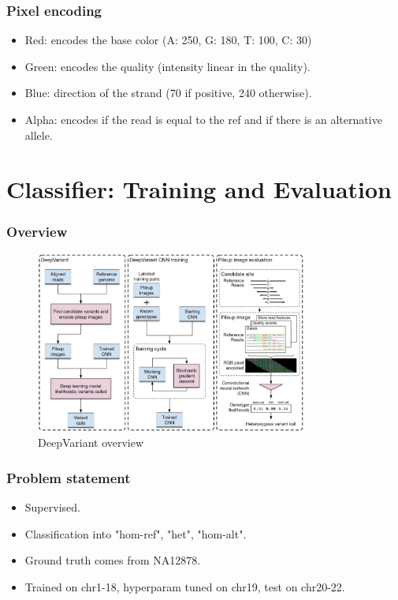 \documentclass{beamer}
\begin{document}
\begin{frame}
    \frametitle{Pixel encoding}

    \begin{itemize}
        \item Red: encodes the base color (A: 250, G: 180, T: 100, C: 30)
        \item Green: encodes the quality (intensity linear in the quality). 
        \item Blue: direction of the strand (70 if positive, 240 otherwise).
        \item Alpha: encodes if the read is equal to the ref and if there is an alternative allele.
    \end{itemize}

\end{frame}

\section{Classifier: Training and Evaluation}

\begin{frame}
    \frametitle{Overview}
    \begin{figure}
        \includegraphics[width=0.8\textwidth]{deep_variant_image.png}
        \caption{DeepVariant overview}
    \end{figure}
\end{frame}

\begin{frame}
    \frametitle{Problem statement}

    \begin{itemize}
        \item Supervised.
        \item Classification into "hom-ref", "het", "hom-alt".
        \item Ground truth comes from NA12878.
        \item Trained on chr1-18, hyperparam tuned on chr19, test on chr20-22.
    \end{itemize}
\end{frame}
\end{document}
